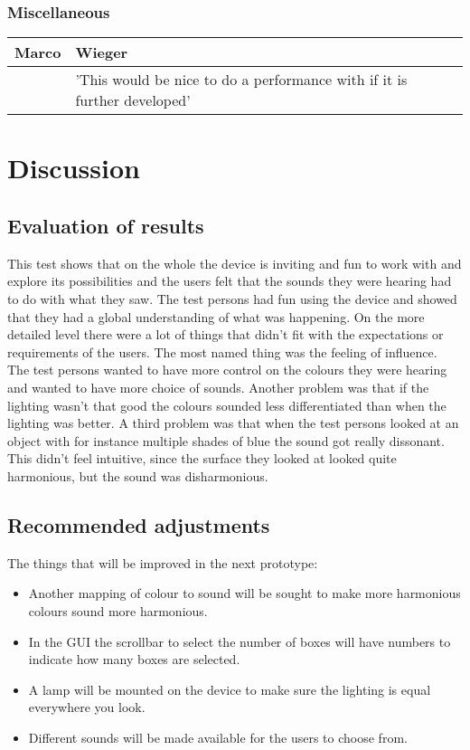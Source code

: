 \documentclass[11pt]{article}
\begin{document}
\subsubsection{Miscellaneous}
\begin{center}
    \begin{tabular}{| p{6cm} | p{6cm} |}
    \hline
  	Marco & Wieger \\ \hline
	  & 'This would be nice to do a performance with if it is further developed' \\ \hline
    \end{tabular}
\end{center}	

\section{Discussion}
\subsection{Evaluation of results}
This test shows that on the whole the device is inviting and fun to work with and explore its possibilities and the users felt that the sounds they were hearing had to do with what they saw. The test persons had fun using the device and showed that they had a global understanding of what was happening. On the more detailed level there were a lot of things that didn't fit with the expectations or requirements of the users. 
The most named thing was the feeling of influence. The test persons wanted to have more control on the colours they were hearing and wanted to have more choice of sounds. 
 Another problem was that if the lighting wasn't that good the colours sounded less differentiated than when the lighting was better. 
 A third  problem was that when the test persons looked at an object with for instance multiple shades of blue the sound got really dissonant. This didn't feel intuitive, since the surface they looked at looked quite harmonious, but the sound was disharmonious.

\subsection{Recommended adjustments} 
The things that will be improved in the next prototype:
\begin{itemize}
\item Another mapping of colour to sound will be sought to make more harmonious colours sound more harmonious.
\item In the GUI the scrollbar to select the number of boxes will have numbers to indicate how many boxes are selected.
\item A lamp will be mounted on the device to make sure the lighting is equal everywhere you look.
\item Different sounds will be made available for the users to choose from.
\end{itemize}
\end{document}

